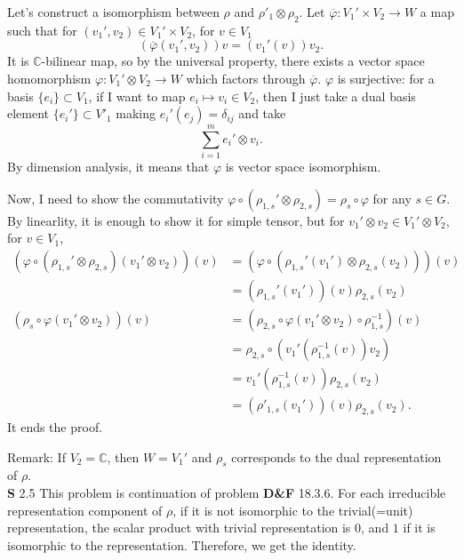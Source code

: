 \documentclass[a4paper, 12pt]{article}
\theoremstyle{Mydefinition}
\theoremstyle{Mytheorem}
\begin{document}
Let's construct a isomorphism between $\rho$ and $\rho'_1\otimes \rho_2$. Let $\overline{\varphi}:V_1'\times V_2\rightarrow W$ a map such that for $(v_1',v_2)\in V_1'\times V_2$, for $v\in V_1$
\begin{equation}
    \left(\overline{\varphi}(v_1',v_2)\right)v = (v_1'(v))v_2.
\end{equation}
It is $\mathbb{C}$-bilinear map, so by the universal property, there exists a vector space homomorphism $\varphi:V_1'\otimes V_2\rightarrow W$ which factors through $\overline{\varphi}$. $\varphi$ is surjective: for a basis $\{e_i\}\subset V_1$, if I want to map $e_i\mapsto v_i\in V_2$, then I just take a dual basis element $\{e_i'\}\subset V'_1$ making $e_i'(e_j) = \delta_{ij}$ and take
\begin{equation}
    \sum_{i=1}^m e_i'\otimes v_i.
\end{equation}
By dimension analysis, it means that $\varphi$ is vector space isomorphism. 

Now, I need to show the commutativity $\varphi\circ \left(\rho_{1,s}'\otimes \rho_{2,s}\right) =\rho_s\circ \varphi$ for any $s\in G$. By linearlity, it is enough to show it for simple tensor, but for $v_1'\otimes v_2\in V_1'\otimes V_2$, for $v\in V_1$,
\begin{equation}
    \begin{split}
        \left(\varphi\circ \left(\rho_{1,s}'\otimes \rho_{2,s}\right)(v_1'\otimes v_2)\right)(v) &= \left(\varphi\circ \left(\rho_{1,s}'(v_1')\otimes \rho_{2,s}(v_2)\right)\right)(v)\\
        &=\left(\rho_{1,s}'(v_1')\right)(v)\rho_{2,s}(v_2)\\
        \left(\rho_s\circ \varphi(v_1'\otimes v_2)\right)(v) &=\left(\rho_{2,s}\circ \varphi(v_1'\otimes v_2)\circ \rho_{1,s}^{-1}\right)(v)\\
        &=\rho_{2,s}\circ \left(v_1'(\rho_{1,s}^{-1}(v))v_2\right)\\
        &=v_1'(\rho_{1,s}^{-1}(v))\rho_{2,s}(v_2)\\
        &=\left(\rho'_{1,s}(v_1')\right)(v)\rho_{2,s}(v_2).
    \end{split}
\end{equation}
It ends the proof.

Remark: If $V_2=\mathbb{C}$, then $W=V_1'$ and $\rho_s$ corresponds to the dual representation of $\rho$.\\

\noindent \textbf{S} 2.5
This problem is continuation of problem \textbf{D\&F} 18.3.6. For each irreducible representation component of $\rho$, if it is not isomorphic to the trivial(=unit) representation, the scalar product with trivial representation is $0$, and $1$ if it is isomorphic to the representation. Therefore, we get the identity.\\
\end{document}
